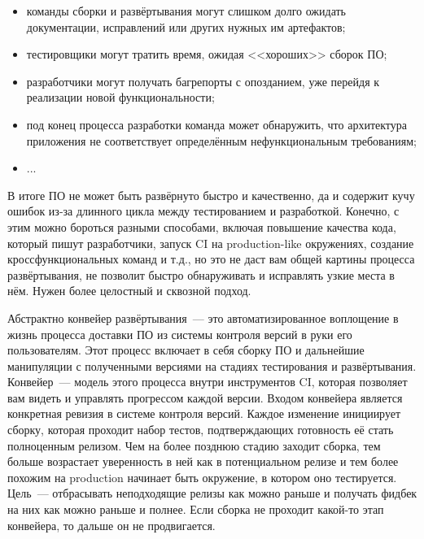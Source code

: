 \documentclass{../../text-style}
\begin{document}
\begin{itemize}
    \item команды сборки и развёртывания могут слишком долго ожидать документации, исправлений или других нужных им артефактов;
    \item тестировщики могут тратить время, ожидая <<хороших>> сборок ПО;
    \item разработчики могут получать багрепорты с опозданием, уже перейдя к реализации новой функциональности;
    \item под конец процесса разработки команда может обнаружить, что архитектура приложения не соответствует определённым нефункциональным требованиям;
    \item ...
\end{itemize}

В итоге ПО не может быть развёрнуто быстро и качественно, да и содержит кучу ошибок из-за длинного цикла между тестированием и разработкой. Конечно, с этим можно бороться разными способами, включая повышение качества кода, который пишут разработчики, запуск CI на production-like окружениях, создание кроссфункциональных команд и т.д., но это не даст вам общей картины процесса развёртывания, не позволит быстро обнаруживать и исправлять узкие места в нём. Нужен более целостный и сквозной подход.

Абстрактно конвейер развёртывания~--- это автоматизированное воплощение в жизнь процесса доставки ПО из системы контроля версий в руки его пользователям. Этот процесс включает в себя сборку ПО и дальнейшие манипуляции с полученными версиями на стадиях тестирования и развёртывания. Конвейер~--- модель этого процесса внутри инструментов CI, которая позволяет вам видеть и управлять прогрессом каждой версии. Входом конвейера является конкретная ревизия в системе контроля версий. Каждое изменение инициирует сборку, которая проходит набор тестов, подтверждающих готовность её стать полноценным релизом. Чем на более позднюю стадию заходит сборка, тем больше возрастает уверенность в ней как в потенциальном релизе и тем более похожим на production начинает быть окружение, в котором оно тестируется. Цель~--- отбрасывать неподходящие релизы как можно раньше и получать фидбек на них как можно раньше и полнее. Если сборка не проходит какой-то этап конвейера, то дальше он не продвигается.
\end{document}
